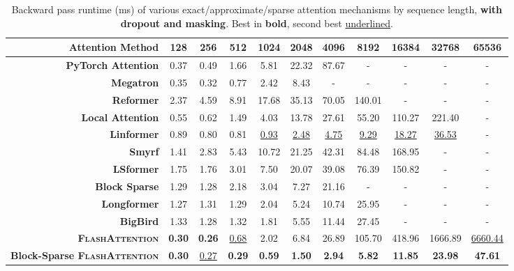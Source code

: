 \documentclass{article}
\newcommand{\sysname}{\textsc{FlashAttention}\xspace}
\begin{document}
\begin{table}
\centering
\scriptsize
\captionsetup{font=small}
\caption{Backward pass runtime (ms) of various exact/approximate/sparse attention mechanisms by sequence length, \textbf{with dropout and masking}. Best in \textbf{bold}, second best \underline{underlined}.}
\begin{tabular}{@{}r|cccccccccc@{}}
\toprule
\textbf{Attention Method} & 128 & 256 & 512 & 1024 & 2048 & 4096 & 8192 & 16384 & 32768 & 65536 \\
\hline
\textbf{PyTorch Attention} & 0.37 & 0.49 & 1.66 & 5.81 & 22.32 & 87.67 & - & - & - & - \\
\textbf{Megatron} & 0.35 & 0.32 & 0.77 & 2.42 & 8.43 & - & - & - & - & - \\
\hline
\textbf{Reformer} & 2.37 & 4.59 & 8.91 & 17.68 & 35.13 & 70.05 & 140.01 & - & - & - \\
\textbf{Local Attention} & 0.55 & 0.62 & 1.49 & 4.03 & 13.78 & 27.61 & 55.20 & 110.27 & 221.40 & - \\
\textbf{Linformer} & 0.89 & 0.80 & 0.81 & \underline{0.93} & \underline{2.48} & \underline{4.75} & \underline{9.29} & \underline{18.27} & \underline{36.53} & - \\
\textbf{Smyrf} & 1.41 & 2.83 & 5.43 & 10.72 & 21.25 & 42.31 & 84.48 & 168.95 & - & - \\
\textbf{LSformer} & 1.75 & 1.76 & 3.01 & 7.50 & 20.07 & 39.08 & 76.39 & 150.82 & - & - \\
\hline
\textbf{Block Sparse} & 1.29 & 1.28 & 2.18 & 3.04 & 7.27 & 21.16 & - & - & - & - \\
\textbf{Longformer} & 1.27 & 1.31 & 1.29 & 2.04 & 5.24 & 10.74 & 25.95 & - & - & - \\
\textbf{BigBird} & 1.33 & 1.28 & 1.32 & 1.81 & 5.55 & 11.44 & 27.45 & - & - & - \\
\hline
\textbf{\sysname} & \textbf{0.30} & \textbf{0.26} & \underline{0.68} & 2.02 & 6.84 & 26.89 & 105.70 & 418.96 & 1666.89 & \underline{6660.44} \\
\textbf{Block-Sparse \sysname} & \textbf{0.30} & \underline{0.27} & \textbf{0.29} & \textbf{0.59} & \textbf{1.50} & \textbf{2.94} & \textbf{5.82} & \textbf{11.85} & \textbf{23.98} & \textbf{47.61} \\
\bottomrule
\end{tabular}
\label{tab:dropout_masking_backward_pass}
\end{table}
\end{document}
